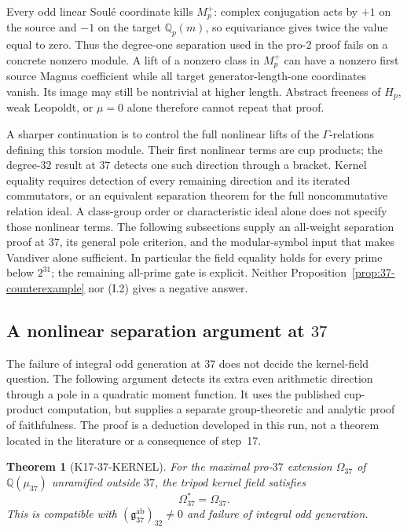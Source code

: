 \documentclass[11pt,a4paper]{article}
\newtheorem{theorem}{Theorem}[section]
\theoremstyle{definition}
\begin{document}
Every odd linear Soul\'e coordinate kills $M_p^+$: complex conjugation acts by $+1$ on the source and $-1$ on the target $\mathbb Q_p(m)$, so equivariance gives twice the value equal to zero. Thus the degree-one separation used in the pro-$2$ proof fails on a concrete nonzero module. A lift of a nonzero class in $M_p^+$ can have a nonzero first source Magnus coefficient while all target generator-length-one coordinates vanish. Its image may still be nontrivial at higher length. Abstract freeness of $H_p$, weak Leopoldt, or $\mu=0$ alone therefore cannot repeat that proof.

A sharper continuation is to control the full nonlinear lifts of the $\Gamma$-relations defining this torsion module. Their first nonlinear terms are cup products; the degree-$32$ result at $37$ detects one such direction through a bracket. Kernel equality requires detection of every remaining direction and its iterated commutators, or an equivalent separation theorem for the full noncommutative relation ideal. A class-group order or characteristic ideal alone does not specify those nonlinear terms. The following subsections supply an all-weight separation proof at $37$, its general pole criterion, and the modular-symbol input that makes Vandiver alone sufficient. In particular the field equality holds for every prime below $2^{31}$; the remaining all-prime gate is explicit. Neither Proposition~\ref{prop:37-counterexample} nor (I.2) gives a negative answer.

\subsection{A nonlinear separation argument at \texorpdfstring{$37$}{37}}
\label{sec:kernel37-poles}

The failure of integral odd generation at $37$ does not decide the kernel-field question. The following argument detects its extra even arithmetic direction through a pole in a quadratic moment function. It uses the published cup-product computation, but supplies a separate group-theoretic and analytic proof of faithfulness. The proof is a deduction developed in this run, not a theorem located in the literature or a consequence of step~17.

\begin{theorem}[K17-37-KERNEL]\label{thm:kernel37-poles}
For the maximal pro-$37$ extension $\Omega_{37}$ of $\mathbb Q(\mu_{37})$ unramified outside $37$, the tripod kernel field satisfies
\[
 \Omega_{37}^*=\Omega_{37}.
\]
This is compatible with $(\mathfrak g_{37}^{\mathrm{ab}})_{32}\ne0$ and failure of integral odd generation.
\end{theorem}
\end{document}
